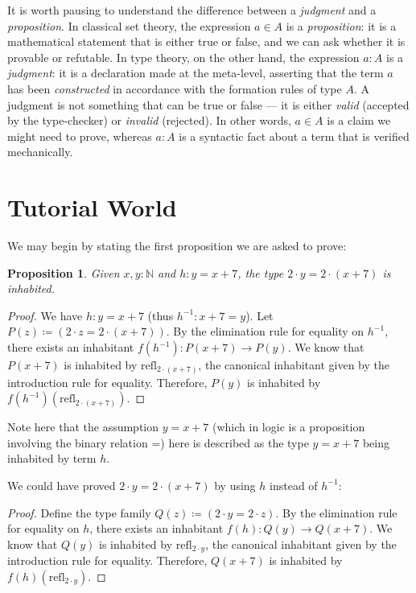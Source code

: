\documentclass[12pt]{article}
\newtheorem{proposition}{Proposition}[section]
\theoremstyle{definition}
\theoremstyle{remark}
\begin{document}
It is worth pausing to understand the difference between a \textit{judgment} and a \textit{proposition}. In classical set theory, the expression $a \in A$ is a \textit{proposition}: it is a mathematical statement that is either true or false, and we can ask whether it is provable or refutable. In type theory, on the other hand, the expression $a : A$ is a \textit{judgment}: it is a declaration made at the meta-level, asserting that the term $a$ has been \textit{constructed} in accordance with the formation rules of type $A$. A judgment is not something that can be true or false --- it is either \textit{valid} (accepted by the type-checker) or \textit{invalid} (rejected). In other words, $a \in A$ is a claim we might need to prove, whereas $a : A$ is a syntactic fact about a term that is verified mechanically.

\section{Tutorial World}

We may begin by stating the first proposition we are asked to prove:

\begin{proposition}\label{prop:simple_rewrite}
Given $x,y:\mathbb{N}$ and $h:y=x+7$, the type $2 \cdot y = 2 \cdot (x + 7)$ is inhabited.
\end{proposition}
\begin{proof}
We have $h:y=x+7$ (thus $h^{-1}:x+7=y$). Let $P(z) \coloneqq (2 \cdot z = 2 \cdot (x + 7))$. By the elimination rule for equality on $h^{-1}$, there exists an inhabitant $f(h^{-1}): P(x+7) \to P(y)$. We know that $P(x+7)$ is inhabited by $\text{refl}_{2 \cdot (x+7)}$, the canonical inhabitant given by the introduction rule for equality. Therefore, $P(y)$ is inhabited by $f(h^{-1})(\text{refl}_{2 \cdot (x+7)})$.
\end{proof}

Note here that the assumption $y=x+7$ (which in logic is a proposition involving the binary relation =) here is described as the type $y = x+7$ being inhabited by term $h$.

We could have proved $2 \cdot y = 2 \cdot (x+7)$ by using $h$ instead of $h^{-1}$:
\begin{proof}
Define the type family $Q(z) \coloneqq (2 \cdot y = 2 \cdot z)$. By the elimination rule for equality on $h$, there exists an inhabitant $f(h): Q(y) \to Q(x+7)$. We know that $Q(y)$ is inhabited by $\text{refl}_{2 \cdot y}$, the canonical inhabitant given by the introduction rule for equality. Therefore, $Q(x+7)$ is inhabited by $f(h)(\text{refl}_{2 \cdot y})$.
\end{proof}
\end{document}
